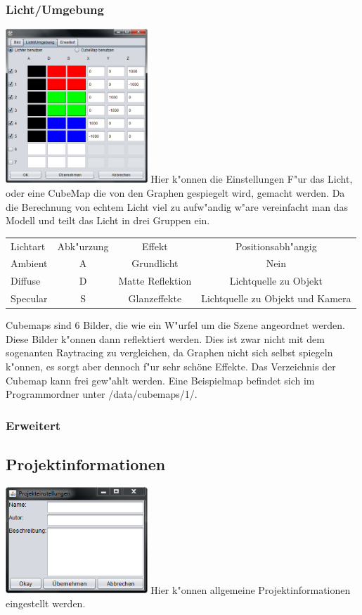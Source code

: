 \documentclass{scrartcl}
\begin{document}
\subsubsection{Licht/Umgebung}
\includegraphics[width=0.4\textwidth]{images/program/settings1-window.png}\newline
Hier k"onnen die Einstellungen F"ur das Licht, oder eine CubeMap die von den Graphen gespiegelt wird, gemacht werden. Da die Berechnung von \newline
echtem Licht viel zu aufw"andig w"are vereinfacht man das Modell und teilt das Licht in drei Gruppen ein.\newline\newline
\begin{tabular}[ht]{|l|c|c|c|}
\hline
Lichtart & Abk"urzung & Effekt & Positionsabh"angig\\
Ambient & A & Grundlicht & Nein\\
Diffuse & D & Matte Reflektion & Lichtquelle zu Objekt\\
Specular & S & Glanzeffekte & Lichtquelle zu Objekt und Kamera\\
 \hline
\end{tabular}\newline\newline
Cubemaps sind 6 Bilder, die wie ein W"urfel um die Szene angeordnet werden. Diese Bilder k"onnen dann reflektiert werden. 
Dies ist zwar nicht mit dem sogenanten Raytracing zu vergleichen, da Graphen nicht sich selbst spiegeln k"onnen, es sorgt aber dennoch f"ur sehr sch\"one Effekte. Das Verzeichnis der Cubemap kann frei gew"ahlt werden. Eine Beispielmap befindet sich im Programmordner unter \glqq /data/cubemaps/1/\grqq .
\subsubsection{Erweitert}
\subsection{Projektinformationen}
\label{chp:Projekt_Einstellungen_Fenster}
\includegraphics[width=0.4\textwidth]{images/program/project-information-window.png}\newline
Hier k"onnen allgemeine Projektinformationen eingestellt werden.
\end{document}
